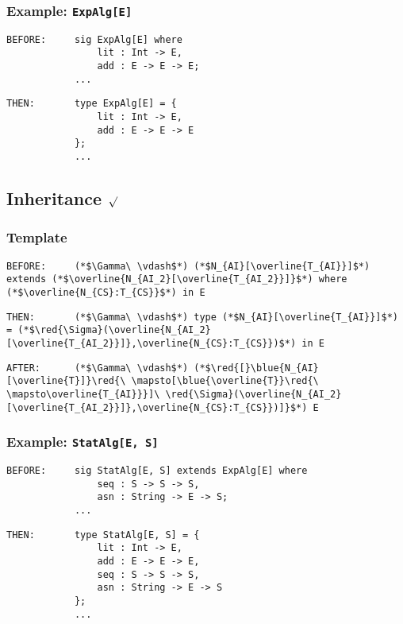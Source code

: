 \documentclass{article}
\newcommand{\red}[1]{\textcolor{red}{#1}}
\newcommand{\blue}[1]{\textcolor{blue}{#1}}
\begin{document}
\begin{spacing}{1.1}
\subsubsection{Example: \lstinline{ExpAlg[E]}}

\begin{lstlisting}[numbers=none]
BEFORE:     sig ExpAlg[E] where
                lit : Int -> E,
                add : E -> E -> E;
            ...
\end{lstlisting}
\begin{lstlisting}[numbers=none]
THEN:       type ExpAlg[E] = {
                lit : Int -> E,
                add : E -> E -> E
            };
            ...
\end{lstlisting}

\newpage

\subsection{Inheritance $\surd$}

\subsubsection{Template}

\begin{lstlisting}[numbers=none]
BEFORE:     (*$\Gamma\ \vdash$*) (*$N_{AI}[\overline{T_{AI}}]$*) extends (*$\overline{N_{AI_2}[\overline{T_{AI_2}}]}$*) where (*$\overline{N_{CS}:T_{CS}}$*) in E
\end{lstlisting}
\begin{lstlisting}[numbers=none]
THEN:       (*$\Gamma\ \vdash$*) type (*$N_{AI}[\overline{T_{AI}}]$*) = (*$\red{\Sigma}(\overline{N_{AI_2}[\overline{T_{AI_2}}]},\overline{N_{CS}:T_{CS}})$*) in E
\end{lstlisting}
\begin{lstlisting}[numbers=none]
AFTER:      (*$\Gamma\ \vdash$*) (*$\red{[}\blue{N_{AI}[\overline{T}]}\red{\ \mapsto[\blue{\overline{T}}\red{\ \mapsto\overline{T_{AI}}}]\ \red{\Sigma}(\overline{N_{AI_2}[\overline{T_{AI_2}}]},\overline{N_{CS}:T_{CS}})]}$*) E
\end{lstlisting}

\subsubsection{Example: \lstinline{StatAlg[E, S]}}

\begin{lstlisting}[numbers=none]
BEFORE:     sig StatAlg[E, S] extends ExpAlg[E] where
                seq : S -> S -> S,
                asn : String -> E -> S;
            ...
\end{lstlisting}
\begin{lstlisting}[numbers=none]
THEN:       type StatAlg[E, S] = {
                lit : Int -> E,
                add : E -> E -> E,
                seq : S -> S -> S,
                asn : String -> E -> S
            };
            ...
\end{lstlisting}


\end{spacing}
\end{document}
